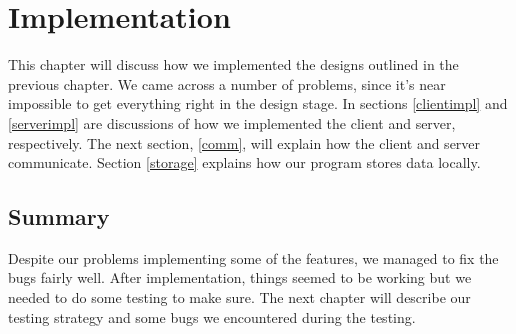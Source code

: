 \chapter{Implementation}
\label{implementation}

This chapter will discuss how we implemented the designs outlined in the previous chapter. We came across a number of problems, since it's near impossible to get everything right in the design stage. In sections \ref{clientimpl} and \ref{serverimpl} are discussions of how we implemented the client and server, respectively. The next section, \ref{comm}, will explain how the client and server communicate. Section \ref{storage} explains how our program stores data locally.









\section{Summary}
Despite our problems implementing some of the features, we managed to fix the bugs fairly well. After implementation, things seemed to be working but we needed to do some testing to make sure. The next chapter will describe our testing strategy and some bugs we encountered during the testing.
